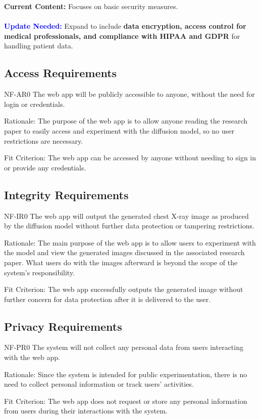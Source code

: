 \documentclass[12pt]{article}
\begin{document}
\textbf{Current Content:} Focuses on basic security measures. \\
\\
\textbf{\textcolor{blue}{Update Needed:}} Expand to include \textbf{data encryption, access control for medical professionals, and compliance with HIPAA and GDPR} for handling patient data.

\subsection{Access Requirements}
NF-AR0 The web app will be publicly accessible to anyone, without the need for login or 
credentials.

Rationale: The purpose of the web app is to allow anyone reading the research paper to easily 
access and experiment with the diffusion model, so no user restrictions are necessary.

Fit Criterion: The web app can be accessed by anyone without needing to sign in or provide any 
credentials.

\subsection{Integrity Requirements}
NF-IR0 The web app will output the generated chest X-ray image as produced by the diffusion model 
without further data protection or tampering restrictions.

Rationale: The main purpose of the web app is to allow users to experiment with the model and view 
the generated images discussed in the associated research paper. What users do with the images 
afterward is beyond the scope of the system’s responsibility.

Fit Criterion: The web app successfully outputs the generated image without further concern for 
data protection after it is delivered to the user.


\subsection{Privacy Requirements}
NF-PR0 The system will not collect any personal data from users interacting with the web app.

Rationale: Since the system is intended for public experimentation, there is no need to collect 
personal information or track users’ activities.

Fit Criterion: The web app does not request or store any personal information from users during 
their interactions with the system.
\end{document}
